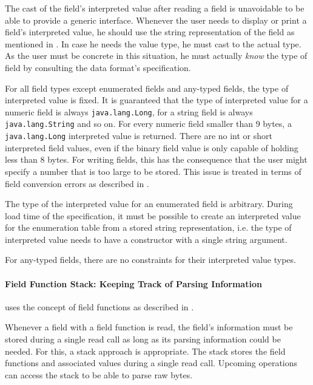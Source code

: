 The cast of the field's interpreted value after reading a field is unavoidable to be able to provide a generic interface. Whenever the user needs to display or print a field's interpreted value, he should use the string representation of the field as mentioned in . In case he needs the value type, he must cast to the actual type. As the user must be concrete in this situation, he must actually \emph{know} the type of field by consulting the data format's specification.

For all field types except enumerated fields and any-typed fields, the type of interpreted value is fixed. It is guaranteed that the type of interpreted value for a numeric field is always \texttt{java.lang.Long}, for a string field is always \texttt{java.lang.String} and so on. For every numeric field smaller than 9 bytes, a \texttt{java.lang.Long} interpreted value is returned. There are no int or short interpreted field values, even if the binary field value is only capable of holding less than 8 bytes. For writing fields, this has the consequence that the user might specify a number that is too large to be stored. This issue is treated in terms of field conversion errors as described in .

The type of the interpreted value for an enumerated field is arbitrary. During load time of the specification, it must be possible to create an interpreted value for the enumeration table from a stored string representation, i.e. the type of interpreted value needs to have a constructor with a single string argument.

For any-typed fields, there are no constraints for their interpreted value types.


\paragraph{Field Function Stack: Keeping Track of Parsing Information}
\label{sec:FieldFunctionStack}

\LibName{} uses the concept of field functions as described in .

Whenever a field with a field function is read, the field's information must be stored during a single read call as long as its parsing information could be needed. For this, a stack approach is appropriate. The stack stores the field functions and associated values during a single read call. Upcoming operations can access the stack to be able to parse raw bytes.

